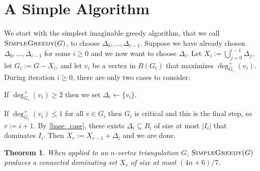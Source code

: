 \documentclass[12pt]{article}
\newtheorem{thm}{Theorem}
\begin{document}
\section{A Simple Algorithm}




We start with the simplest imaginable greedy algorithm, that we call $\textsc{SimpleGreedy}(G)$, to choose $\Delta_0,\ldots,\Delta_{r-1}$.  Suppose we have already chosen $\Delta_0,\ldots,\Delta_{i-1}$ for some $i\ge 0$ and we now want to choose $\Delta_i$.  Let $X_i:=\bigcup_{j=0}^{i-1}\Delta_j$, let $G_i:=G-X_i$, and let $v_i$ be a vertex in $B(G_i)$ that maximizes $\deg^+_{G_i}(v_i)$.  During iteration $i\ge 0$, there are only two cases to consider:
\begin{compactenum}
    \item If $\deg^+_{G_i}(v_i)\ge 2$ then we set $\Delta_i\gets\{v_i\}$.
    \item If $\deg^+_{G_i}(v_i)\le 1$ for all $v\in G_i$ then $G_i$ is critical and this is the final step, so $r:=i+1$.  By \cref{base_case}, there exists $\Delta_i\subseteq B_i$ of size at most $|I_i|$ that dominates $I_i$. Then $X_r:=X_{r-1}+\Delta_{i}$ and we are done.
\end{compactenum}

\begin{thm}\label{simple_greedy}
  When applied to an $n$-vertex triangulation $G$,  $\textsc{SimpleGreedy}(G)$ produces a connected dominating set $X_r$ of size at most $(4n+6)/7$.
\end{thm}
\end{document}
